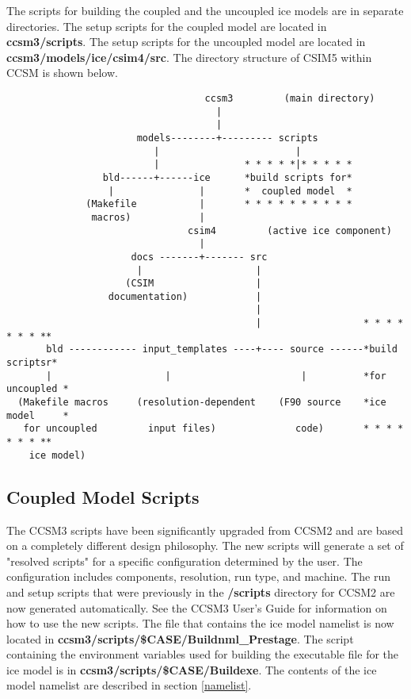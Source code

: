 
The scripts for building the coupled and the uncoupled ice models are in
separate directories. The setup scripts for the coupled model are 
located in {\bf ccsm3/scripts}.  The setup scripts for the uncoupled model are
located in {\bf ccsm3/models/ice/csim4/src}.  The directory structure of CSIM5
within CCSM is shown below.

\begin{verbatim}
                                   ccsm3         (main directory)
                                     |
                                     |
                       models--------+--------- scripts
                          |                        |
                          |               * * * * *|* * * * * 
                 bld------+------ice      *build scripts for*
                  |               |       *  coupled model  *
              (Makefile           |       * * * * * * * * * *
               macros)            |
                                csim4         (active ice component)
                                  |
                      docs -------+------- src
                       |                    |
                     (CSIM                  |
                  documentation)            |
                                            |
                                            |                  * * * * * * * **
       bld ------------ input_templates ----+---- source ------*build scriptsr*
       |                    |                       |          *for uncoupled *
  (Makefile macros     (resolution-dependent    (F90 source    *ice model     *
   for uncoupled         input files)              code)       * * * * * * * **
    ice model)
\end{verbatim}

\subsection{Coupled Model Scripts}
\label{uncoupled_scripts}

The CCSM3 scripts have been significantly upgraded from CCSM2 and are
based on a completely different design philosophy.  The new scripts will
generate a set of "resolved scripts" for a specific configuration determined
by the user. The configuration includes components, resolution, run type, and
machine. The run and setup scripts that were previously in the {\bf /scripts}
directory for CCSM2 are now generated automatically.  See the CCSM3 User's Guide for
information on how to use the new scripts.  The file that contains the ice model
namelist is now located in {\bf ccsm3/scripts/\$CASE/Buildnml\_Prestage}. The
script containing the environment variables used for building the executable
file for the ice model is in {\bf ccsm3/scripts/\$CASE/Buildexe}.
The contents of the ice model namelist are described in section \ref{namelist}.

